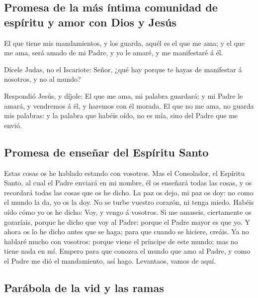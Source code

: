 \hypertarget{promesa-de-la-muxe1s-uxedntima-comunidad-de-espuxedritu-y-amor-con-dios-y-jesuxfas}{%
\subsection{Promesa de la más íntima comunidad de espíritu y amor con
Dios y
Jesús}\label{promesa-de-la-muxe1s-uxedntima-comunidad-de-espuxedritu-y-amor-con-dios-y-jesuxfas}}

 El que tiene mis mandamientos, y los guarda, aquél es el
que me ama; y el que me ama, será amado de mi Padre, y yo le amaré, y me
manifestaré á él.

 Dícele Judas, no el Iscariote: Señor, ¿qué hay porque te
hayas de manifestar á nosotros, y no al mundo?

 Respondió Jesús, y díjole: El que me ama, mi palabra
guardará; y mi Padre le amará, y vendremos á él, y haremos con él
morada.  El que no me ama, no guarda mis palabras: y la
palabra que habéis oído, no es mía, sino del Padre que me envió.

\hypertarget{promesa-de-enseuxf1ar-del-espuxedritu-santo}{%
\subsection{Promesa de enseñar del Espíritu
Santo}\label{promesa-de-enseuxf1ar-del-espuxedritu-santo}}

 Estas cosas os he hablado estando con vosotros.
 Mas el Consolador, el Espíritu Santo, al cual el Padre
enviará en mi nombre, él os enseñará todas las cosas, y os recordará
todas las cosas que os he dicho.  La paz os dejo, mi paz os
doy: no como el mundo la da, yo os la doy. No se turbe vuestro corazón,
ni tenga miedo.  Habéis oído cómo yo os he dicho: Voy, y
vengo á vosotros. Si me amaseis, ciertamente os gozaríais, porque he
dicho que voy al Padre: porque el Padre mayor es que yo.  Y
ahora os lo he dicho antes que se haga; para que cuando se hiciere,
creáis.  Ya no hablaré mucho con vosotros: porque viene el
príncipe de este mundo; mas no tiene nada en mí.  Empero
para que conozca el mundo que amo al Padre, y como el Padre me dió el
mandamiento, así hago. Levantaos, vamos de aquí.

\hypertarget{paruxe1bola-de-la-vid-y-las-ramas}{%
\subsection{Parábola de la vid y las
ramas}\label{paruxe1bola-de-la-vid-y-las-ramas}}

